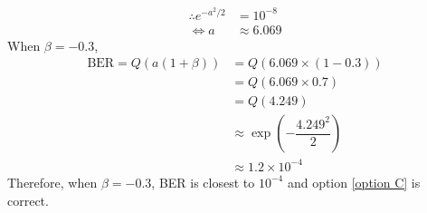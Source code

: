 \documentclass[journal,10pt,twocolumn]{IEEEtran}
\begin{document}
\begin{align}
\therefore e^{-a^2 / 2} &= 10^{-8}\\
\Leftrightarrow a &\approx 6.069
\end{align}
When $\beta = -0.3$,
\begin{align}
\text{BER} = Q(a(1+\beta)) &= Q(6.069 \times (1-0.3))\\
&= Q(6.069 \times 0.7)\\
&= Q(4.249)\\
&\approx \exp (-\dfrac{4.249^2}{2})\\
&\approx 1.2 \times 10^{-4}
\end{align}
Therefore, when $\beta = -0.3$, BER is closest to $10^{-4}$ and option \ref{option C} is correct.
\end{document}
